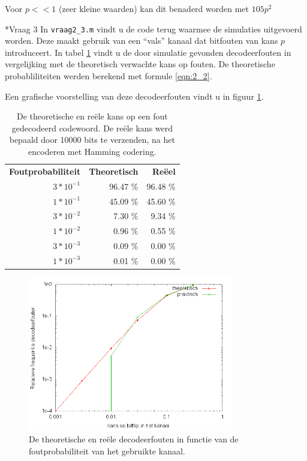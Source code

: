 \documentclass[]{article}
\begin{document}
\begin{section}
\begin{subsection}
    	Voor $p << 1$ (zeer kleine waarden) kan dit benaderd worden met $105p^2$
    \end{subsection}

    \begin{subsection}*{Vraag 3} %
        In \texttt{vraag2\_3.m} vindt u de code terug waarmee de simulaties
        uitgevoerd worden. Deze maakt gebruik van een ``vals'' kanaal dat
        bitfouten van kans $p$ introduceert. In tabel \ref{tab:2_3} vindt u
        de door simulatie gevonden decodeerfouten in vergelijking met de
        theoretisch verwachte kans op fouten. De theoretische probabliliteiten
        werden berekend met formule \ref{eqn:2_2}.

        Een grafische voorstelling van deze decodeerfouten vindt u in figuur
        \ref{fig:2_3}.

        \begin{table}
            \centering
            \begin{tabular}{rrr}
                \textbf{Foutprobabiliteit} &
                \textbf{Theoretisch} &
                \textbf{Re\"eel} \\
                $3 * 10^{-1}$ & 96.47 \% & 96.48 \% \\
                $1 * 10^{-1}$ & 45.09 \% & 45.60 \% \\
                $3 * 10^{-2}$ &  7.30 \% &  9.34 \% \\
                $1 * 10^{-2}$ &  0.96 \% &  0.55 \% \\
                $3 * 10^{-3}$ &  0.09 \% &  0.00 \% \\
                $1 * 10^{-3}$ &  0.01 \% &  0.00 \%
            \end{tabular}
            \caption{De theoretische en re\"ele kans op een fout gedecodeerd
                codewoord. De re\"ele kans werd bepaald door 10000 bits te
            verzenden, na het encoderen met Hamming codering.}
            \label{tab:2_3}
        \end{table}

        \begin{figure}[h]
            \centering
            \includegraphics[width=0.8\textwidth]{vraag2_3.png}
            \caption{De theoretische en re\"ele decodeerfouten in functie
            van de foutprobabiliteit van het gebruikte kanaal.}
            \label{fig:2_3}
        \end{figure}


\end{subsection}
\end{section}
\end{document}
